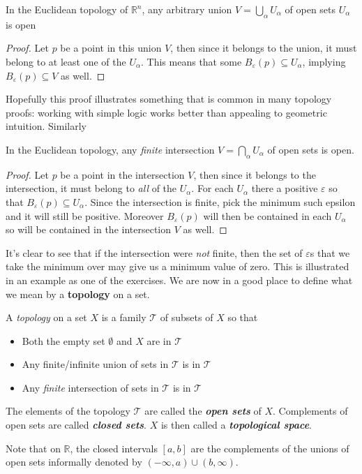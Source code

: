 \documentclass[../master.tex]{subfiles}
\begin{document}
	\begin{prop}
		In the Euclidean topology of $\mathbb{R}^n$, any arbitrary union $V = \bigcup_\alpha U_\alpha$ of open sets $U_\alpha$ is open 
	\end{prop}
	\begin{proof}
		Let $p$ be a point in this union $V$, then since it belongs to the union, it must belong to at least one of the $U_\alpha$. This means that some $B_\varepsilon(p) \subseteq U_\alpha$, implying $B_\varepsilon (p) \subseteq V$ as well.
	\end{proof}
	Hopefully this proof illustrates something that is common in many topology proofs: working with simple logic works better than appealing to geometric intuition. Similarly
	\begin{prop}
		In the Euclidean topology, any \emph{finite} intersection $V = \bigcap_\alpha U_\alpha$ of open sets is open.
	\end{prop}
	\begin{proof}
		Let $p$ be a point in the intersection $V$, then since it belongs to the intersection, it must belong to \emph{all} of the $U_\alpha$. For each $U_\alpha$ there a positive $\varepsilon$ so that $B_\varepsilon(p) \subseteq U_\alpha$. Since the intersection is finite, pick the minimum such epsilon and it will still be positive. Moreover $B_\varepsilon(p)$ will then be contained in each $U_\alpha$ so will be contained in the intersection $V$ as well.
	\end{proof}
	It's clear to see that if the intersection were \emph{not} finite, then the set of $\varepsilon$s that we take the minimum over may give us a minimum value of zero. This is illustrated in an example as one of the exercises. We are now in a good place to define what we mean by a \textbf{topology} on a set.
	
	\begin{defn}\label{def:Topology}
		A \emph{topology} on a set $X$ is a family $\mathcal T$ of subsets of $X$ so that
		\begin{itemize}
			\item Both the empty set $\emptyset$ and $X$ are in $\mathcal T$
			\item Any finite/infinite union of sets in $\mathcal T$ is in $\mathcal T$
			\item Any \emph{finite} intersection of sets in $\mathcal T$ is in $\mathcal T$
		\end{itemize}
		The elements of the topology $\mathcal T$ are called the \textbf{\emph{open sets}} of $X$. Complements of open sets are called \textbf{\emph{closed sets}}. $X$ is then called a \textbf{\emph{topological space}}.
	\end{defn}
	Note that on $\mathbb{R}$, the closed intervals $[a,b]$ are the complements of the unions of open sets informally denoted by $(-\infty, a) \cup (b, \infty)$.
	
\end{document}
